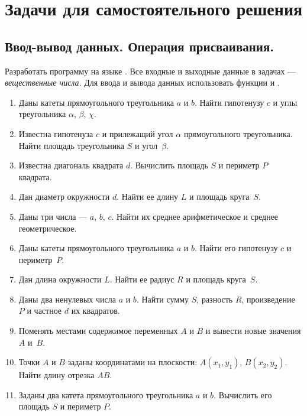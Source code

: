 \section[Задачи для самостоятельного решения]{Задачи для самостоятельного решения}
\subsection[Ввод-вывод данных. Операция присваивания.]{Ввод-вывод данных. Операция присваивания.}
Разработать программу на языке . Все входные и выходные данные в задачах --- \emph{вещественные числа}.
Для ввода и вывода данных использовать функции  и .
\begin{enumerate}
\item Даны катеты прямоугольного треугольника $a$ и $b$. Найти гипотенузу
$c$ и углы треугольника ${\alpha}$, ${\beta}$, ${\chi}$.

\item Известна гипотенуза $c$ и прилежащий угол ${\alpha}$ прямоугольного
треугольника. Найти площадь треугольника $S$ и угол~${\beta}$.

\item Известна диагональ квадрата $d$. Вычислить площадь $S$ и периметр
$P$ квадрата.

\item Дан диаметр окружности $d$. Найти ее длину $L$ и площадь круга~$S$.

\item Даны три числа --- $a$, $b$, $c$. Найти их среднее
арифметическое и среднее геометрическое.

\item Даны катеты прямоугольного треугольника $a$ и $b$. Найти его гипотенузу
$c$ и периметр~$P$.

\item Дан длина окружности $L$. Найти ее радиус $R$ и площадь круга~$S$.

\item Даны два ненулевых числа $a$ и $b$. Найти сумму $S$,
разность $R$, произведение $P$ и частное $d$ их квадратов.

\item Поменять местами содержимое переменных $A$ и $B$ и вывести новые значения $A$ и~$B$.

\item Точки $A$ и $B$ заданы координатами на плоскости:
$A(x_1,y_1)$, $B(x_2,y_2)$. Найти длину отрезка $AB$.

\item Заданы два катета прямоугольного треугольника $a$ и $b$. Вычислить его
площадь $S$ и периметр $P$.


\end{enumerate}
